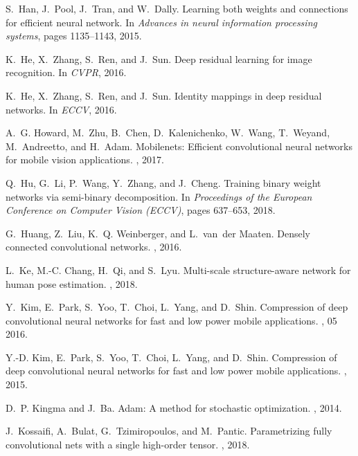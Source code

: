 \documentclass[10pt,twocolumn,letterpaper]{article}
\begin{document}
{\begin{thebibliography}{10}
S.~Han, J.~Pool, J.~Tran, and W.~Dally.
\newblock Learning both weights and connections for efficient neural network.
\newblock In {\em Advances in neural information processing systems}, pages
  1135--1143, 2015.

K.~He, X.~Zhang, S.~Ren, and J.~Sun.
\newblock Deep residual learning for image recognition.
\newblock In {\em CVPR}, 2016.

K.~He, X.~Zhang, S.~Ren, and J.~Sun.
\newblock Identity mappings in deep residual networks.
\newblock In {\em ECCV}, 2016.

A.~G. Howard, M.~Zhu, B.~Chen, D.~Kalenichenko, W.~Wang, T.~Weyand,
  M.~Andreetto, and H.~Adam.
\newblock Mobilenets: Efficient convolutional neural networks for mobile vision
  applications.
, 2017.

Q.~Hu, G.~Li, P.~Wang, Y.~Zhang, and J.~Cheng.
\newblock Training binary weight networks via semi-binary decomposition.
\newblock In {\em Proceedings of the European Conference on Computer Vision
  (ECCV)}, pages 637--653, 2018.

G.~Huang, Z.~Liu, K.~Q. Weinberger, and L.~van~der Maaten.
\newblock Densely connected convolutional networks.
, 2016.

L.~Ke, M.-C. Chang, H.~Qi, and S.~Lyu.
\newblock Multi-scale structure-aware network for human pose estimation.
, 2018.

Y.~Kim, E.~Park, S.~Yoo, T.~Choi, L.~Yang, and D.~Shin.
\newblock Compression of deep convolutional neural networks for fast and low
  power mobile applications.
, 05 2016.

Y.-D. Kim, E.~Park, S.~Yoo, T.~Choi, L.~Yang, and D.~Shin.
\newblock Compression of deep convolutional neural networks for fast and low
  power mobile applications.
, 2015.

D.~P. Kingma and J.~Ba.
\newblock Adam: A method for stochastic optimization.
, 2014.

J.~Kossaifi, A.~Bulat, G.~Tzimiropoulos, and M.~Pantic.
\newblock Parametrizing fully convolutional nets with a single high-order
  tensor.
, 2018.


\end{thebibliography}}
\end{document}
